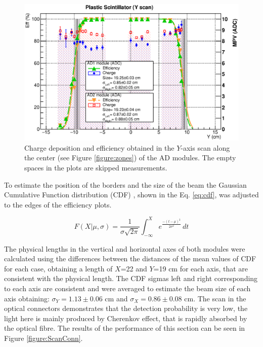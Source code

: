 	\begin{figure}[hb!]
		\begin{center}
			\includegraphics[scale=0.5]{./images/scan/Yaxis_scan.eps}
			\caption{
				Charge deposition and efficiency obtained in the $Y$-axis scan along the center (see Figure \ref{figure:zones}) of the AD modules. 
				The empty spaces in the plots are skipped measurements.
				}
			\label{figure:ScanY-ADcenter}
		\end{center}
	\end{figure}
	To estimate the position of the borders and the size of the  beam the
	Gaussian Cumulative Function distribution (CDF) \cite{troveCDF}, shown in
	the Eq. \ref{eq:cdf}, was adjusted to the edges of the efficiency plots.
	
	\begin{equation} \label{eq:cdf}
	F(X|\mu,\sigma)=\frac{1}{\sigma\sqrt{2\pi}} \displaystyle \int_{-\infty}^{X}
	e^{\frac{-(t-\mu)^{2}}{2\sigma^{2}}} \, dt
	\end{equation}
	
	The physical lengths in the vertical and horizontal axes of both modules 
	were calculated using the differences between the distances of the mean 
	values of CDF for each case, obtaining a length of $X$=22 and $Y$=19 cm 
	for each axis, that are consistent with the physical length.
	The CDF sigmas left and right corresponding to each axis are consistent and were averaged to estimate the beam size of each axis obtaining:  $\sigma_{Y}=1.13\pm 0.06$ cm and $\sigma_{X}=0.86\pm0.08$ cm.
	The scan in the optical connectors demonstrates that the detection 
	probability is very low, the light here is mainly produced by Cherenkov 
	effect, that is rapidly absorbed by the optical fibre. %
	The results of the performance of this section can be seen in Figure \ref{figure:ScanConn}.
	
